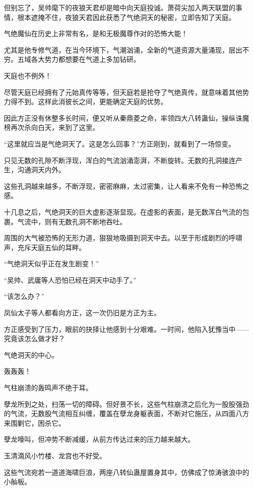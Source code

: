 \begin{this_body}
但别忘了，吴帅麾下的夜狼天君却是暗中向天庭投诚。萧荷尖加入两天联盟的事情，根本遮掩不住，夜狼天君因此获悉了气绝洞天的秘密，立即告知了天庭。

气绝魔仙在历史上非常有名，是和无极魔尊作对的恐怖大能！

尤其是他专修气道，在当今环境下，气潮汹涌，全新的气道资源大量涌现，层出不穷。五域各大势力都想要在气道上多加钻研。

天庭也不例外！

尽管天庭已经拥有了元始真传等等，但天庭若是抢夺了气绝真传，就意味着其他势力得不到。这样此消彼长之间，更能确定天庭的优势。

因此方正没有休整多长时间，便又听从秦鼎菱之命，率领四大八转蛊仙，操纵诛魔榜再次杀向白天，来到了这里。

“这里就应当是气绝洞天了。这是怎么回事？”方正刚到，就看到了一场惊变。

只见无数的孔隙不断浮现，浑白的气流汹涌澎湃，不断旋转。无数的孔洞接连产生，沟通洞天内外。

这些孔洞越来越多，不断浮现，密密麻麻，太过密集，让人看来不免有一种恐怖之感。

十几息之后，气绝洞天的巨大虚影逐渐显现。在虚影的表面，是无数浑白气流的包裹。气流中，则有无数孔洞不断地吞吐。

周围的大气被恐怖的无形力道，狠狠地吸摄到洞天中去。以至于形成剧烈的呼啸声，充斥天庭五仙的耳畔。

“气绝洞天似乎正在发生剧变！”

“吴帅、武庸等人恐怕已经在洞天中动手了。”

“该怎么办？”

凤仙太子等人都看向方正，这一次仍旧是方正为主。

方正感受到了压力，眼前的抉择让他感到十分艰难。一时间，他陷入犹豫当中——究竟该怎么做才好？

气绝洞天的中心。

轰轰轰！

气柱崩溃的轰鸣声不绝于耳。

孽龙所到之处，扫荡一切的障碍。但好景不长，这些气柱崩溃之后化为一股股强劲的气流，无数股气流相互纠缠，覆盖在孽龙身躯表面，不断对它施压，从四面八方来围剿它，困杀它。

孽龙嚎叫，但冲势不断减缓，从前方传达过来的压力越来越大。

玉清滴风小竹楼、龙宫也不好受。

这些气流宛若一道道海啸巨浪，两座八转仙蛊屋置身其中，仿佛成了惊涛骇浪中的小舢板。


\end{this_body}

